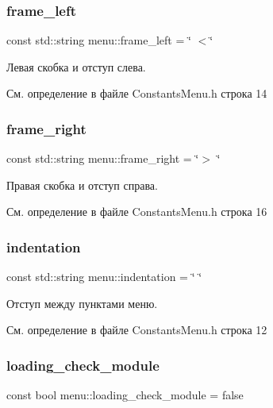 \subsubsection{\texorpdfstring{frame\+\_\+left}{frame\_left}}
{\footnotesize\ttfamily const std\+::string menu\+::frame\+\_\+left = \char`\"{} $<$\char`\"{}}

Левая скобка и отступ слева. 

См. определение в файле Constants\+Menu.\+h строка 14

\mbox{\label{namespacemenu_a3f786c7ab3caec7dfef9e1fa61b52ae7}} 
\subsubsection{\texorpdfstring{frame\+\_\+right}{frame\_right}}
{\footnotesize\ttfamily const std\+::string menu\+::frame\+\_\+right = \char`\"{}$>$ \char`\"{}}

Правая скобка и отступ справа. 

См. определение в файле Constants\+Menu.\+h строка 16

\mbox{\label{namespacemenu_ac0906d6effd5dc68552a724a3edb9330}} 
\subsubsection{\texorpdfstring{indentation}{indentation}}
{\footnotesize\ttfamily const std\+::string menu\+::indentation = \char`\"{} \char`\"{}}

Отступ между пунктами меню. 

См. определение в файле Constants\+Menu.\+h строка 12

\mbox{\label{namespacemenu_aaea5c70964114a416caa58676ddf8066}} 
\subsubsection{\texorpdfstring{loading\+\_\+check\+\_\+module}{loading\_check\_module}}
{\footnotesize\ttfamily const bool menu\+::loading\+\_\+check\+\_\+module = false}

